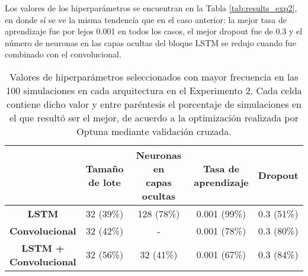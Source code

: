 \documentclass[../../main.tex]{subfiles}
\begin{document}
Los valores de los hiperparámetros se encuentran en la Tabla \ref{tab:results_exp2}, en
donde sí se ve la misma tendencia que en el caso anterior: la mejor tasa de aprendizaje
fue por lejos 0.001 en todos los casos, el mejor dropout fue de 0.3 y el número de
neuronas en las capas ocultas del bloque LSTM se redujo cuando fue combinado con el
convolucional.

\begin{table}[ht]
    \centering
    \renewcommand{\arraystretch}{1.2}
    \begin{tabular}{|c|c|c|c|c|}
        \hline
            & \makecell{\textbf{Tamaño}\\\textbf{de lote}}
            & \makecell{\textbf{Neuronas en}\\\textbf{capas ocultas}}
            & \makecell{\textbf{Tasa de}\\\textbf{aprendizaje}}
            & \textbf{Dropout} \\ \hline\hline
        \textbf{LSTM}
            & 32 (39\%) & 128 (78\%) & 0.001 (99\%) & 0.3 (51\%) \\ \hline
        \textbf{Convolucional}
            & 32 (42\%) & -          & 0.001 (78\%) & 0.3 (80\%) \\ \hline
        \makecell{\textbf{LSTM +}\\\textbf{Convolucional}}
            & 32 (56\%) & 32 (41\%)  & 0.001 (67\%) & 0.3 (84\%) \\
        \hline
    \end{tabular}
    \caption{Valores de hiperparámetros seleccionados con mayor frecuencia en las 100
    simulaciones en cada arquitectura en el Experimento 2. Cada celda contiene dicho valor
    y entre paréntesis el porcentaje de simulaciones en el que resultó ser el mejor, de
    acuerdo a la optimización realizada por Optuna mediante validación cruzada.}
    \label{tab:hyperparams_exp2}
\end{table}
\end{document}
